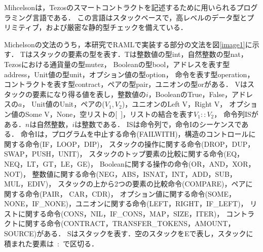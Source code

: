 \documentclass{kuisthesis}
\begin{document}
Mihcelsonは，Tezosのスマートコントラクトを記述するために用いられるプログラミング言語である．
この言語はスタックベースで，高レベルのデータ型とプリミティブ，および厳密な静的型チェックを備えている．

Michelsonの文法のうち，本研究でRAMLで実装する部分の文法を図\ref{image1}に示す．
Tはスタックの要素の型を表す．Tは整数値の型int，自然整数の型nat，Tezosにおける通貨量の型mutez，
Booleanの型bool，アドレスを表す型address，Unit値の型unit，オプション値の型option，
命令を表す型operation，コントラクトを表す型contract，ペアの型pair，ユニオンの型orがある．
Vはスタックの要素になり得る値を表し，整数値の$i$，BooleanのTrue，False，アドレスの$a$，
Unit値のUnit，ペアの($V_1,V_2$)，ユニオンのLeft V，Right V，
オプション値のSome V，None，空リストの[\ ]，リストの結合を表す$V_1 :: V_2$，
命令列ISがある．$n$は自然整数，$i$は整数である．
ISは命令列で，命令Iのシーケンスである．
命令Iは，プログラムを中止する命令(FAILWITH)，構造のコントロールに関する命令(IF，LOOP，DIP)，
スタックの操作に関する命令(DROP，DUP，SWAP，PUSH，UNIT)，
スタックのトップ要素の比較に関する命令(EQ，NEQ，LT，GT，LE，GE)，
Booleanに関する操作の命令(OR，AND，XOR，NOT)，
整数値に関する命令(NEG，ABS，ISNAT，INT，ADD，SUB，MUL，EDIV)，
スタックの上から2つの要素の比較命令(COMPARE)，ペアに関する命令(PAIR， CAR，CDR)，
オプション値に関する命令(SOME，NONE，IF\_NONE)，ユニオンに関する命令(LEFT，RIGHT，IF\_LEFT)，
リストに関する命令(CONS，NIL，IF\_CONS，MAP，SIZE，ITER)，
コントラクトに関する命令(CONTRACT，TRANSFER\_TOKENS，AMOUNT，SOURCE)がある．
Sはスタックを表す．空のスタックをEで表し，スタックに積まれた要素は\ :\ で区切る．

\end{document}
